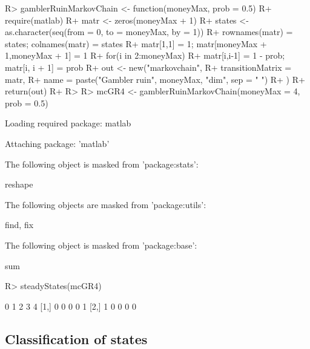 \documentclass[article,nojss]{jss}
\begin{document}
\begin{CodeChunk}

\begin{CodeInput}
R> gamblerRuinMarkovChain <- function(moneyMax, prob = 0.5) {
R+   require(matlab)
R+   matr <- zeros(moneyMax + 1)
R+   states <- as.character(seq(from = 0, to = moneyMax, by = 1))
R+   rownames(matr) = states; colnames(matr) = states
R+   matr[1,1] = 1; matr[moneyMax + 1,moneyMax + 1] = 1
R+   for(i in 2:moneyMax)
R+   { matr[i,i-1] = 1 - prob; matr[i, i + 1] = prob   }
R+   out <- new("markovchain",  
R+            transitionMatrix = matr, 
R+            name = paste("Gambler ruin", moneyMax, "dim", sep = " ")
R+            )
R+   return(out)
R+ }
R> 
R> mcGR4 <- gamblerRuinMarkovChain(moneyMax = 4, prob = 0.5)
\end{CodeInput}

\begin{CodeOutput}
Loading required package: matlab
\end{CodeOutput}

\begin{CodeOutput}

Attaching package: 'matlab'
\end{CodeOutput}

\begin{CodeOutput}
The following object is masked from 'package:stats':

    reshape
\end{CodeOutput}

\begin{CodeOutput}
The following objects are masked from 'package:utils':

    find, fix
\end{CodeOutput}

\begin{CodeOutput}
The following object is masked from 'package:base':

    sum
\end{CodeOutput}

\begin{CodeInput}
R> steadyStates(mcGR4)
\end{CodeInput}

\begin{CodeOutput}
     0 1 2 3 4
[1,] 0 0 0 0 1
[2,] 1 0 0 0 0
\end{CodeOutput}
\end{CodeChunk}

\hypertarget{classification-of-states}{%
\subsection{Classification of states}\label{classification-of-states}}
\end{document}
